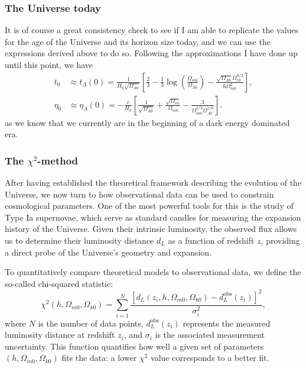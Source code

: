\documentclass{aa}
\numberwithin{equation}{section}
\numberwithin{table}{section}
\numberwithin{figure}{section}
\begin{document}


\subsubsection{The Universe today}
It is of course a great consistency check to see if I am able to replicate the values for the age of the Universe and its horizon size today, and we can use the expressions derived above to do so. Following the approximations I have done up until this point, we have
\begin{align}
  t_0 &\approx t_{\Lambda}(0) = \frac{1}{H_0\sqrt{\Omega_{\Lambda0}}}\left[\frac{2}{3}-\frac{1}{3}\log\left(\frac{\Omega_{m0}}{\Omega_{\Lambda0}}\right)-\frac{\sqrt{\Omega_{\Lambda0}}\Omega_{r0}^{3/2}}{6\Omega^2_{m0}}\right],
  \\
  \eta_0 &\approx \eta_\Lambda(0) = -\frac{c}{H_0}\left[\frac{1}{\sqrt{\Omega_{\Lambda0}}} +\frac{\sqrt{\Omega_{r0}}}{\Omega_{m0}} - \frac{3}{\Omega_{m0}^{1/3}\Omega_{\Lambda0}^{1/6}} \right].
\end{align}
as we know that we currently are in the beginning of a dark energy dominated era.


\subsubsection{The \texorpdfstring{$\chi^2$}{Lg}-method}
After having established the theoretical framework describing the evolution of the Universe, we now turn to how observational data can be used to constrain cosmological parameters. One of the most powerful tools for this is the study of Type Ia supernovae, which serve as standard candles for measuring the expansion history of the Universe. Given their intrinsic luminosity, the observed flux allows us to determine their luminosity distance $d_L$ as a function of redshift $z$, providing a direct probe of the Universe's geometry and expansion.

To quantitatively compare theoretical models to observational data, we define the so-called chi-squared statistic:
\begin{equation}
  \chi^2(h, \Omega_{m0}, \Omega_{k0}) = \sum_{i=1}^{N} \frac{ \left[ d_L(z_i, h, \Omega_{m0}, \Omega_{k0}) - d_L^{\text{obs}}(z_i) \right]^2 }{\sigma_i^2},
\end{equation}
where $N$ is the number of data points, $d_L^{\text{obs}}(z_i)$ represents the measured luminosity distance at redshift $z_i$, and $\sigma_i$ is the associated measurement uncertainty. This function quantifies how well a given set of parameters $(h, \Omega_{m0}, \Omega_{k0})$ fits the data: a lower $\chi^2$ value corresponds to a better fit. 
\end{document}
